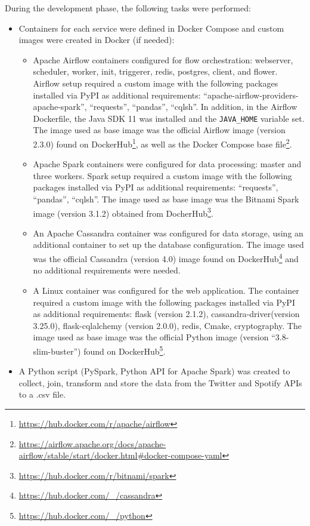 \nonzeroparskip During the development phase, the following tasks were performed:
\begin{itemize}
	\item Containers for each service were defined in Docker Compose and custom images were created in Docker (if needed):
	\begin{itemize}
		\item Apache Airflow containers configured for flow orchestration: webserver, scheduler, worker, init, triggerer, redis, postgres, client, and flower. Airflow setup required a custom image with the following packages installed via PyPI as additional requirements: ``apache-airflow-providers-apache-spark'', ``requests'', ``pandas'', ``cqlsh''. In addition, in the Airflow Dockerfile, the Java SDK 11 was installed and the \texttt{JAVA\_HOME} variable set. The image used as base image was the official Airflow image (version 2.3.0) found on DockerHub\footnote{\url{https://hub.docker.com/r/apache/airflow}}, as well as the Docker Compose base file\footnote{\url{https://airflow.apache.org/docs/apache-airflow/stable/start/docker.html\#docker-compose-yaml}}.
		\item Apache Spark containers were configured for data processing: master and three workers. Spark setup required a custom image with the following packages installed via PyPI as additional requirements: ``requests'', ``pandas'', ``cqlsh''. The image used as base image was the Bitnami Spark image (version 3.1.2) obtained from DocherHub\footnote{\url{https://hub.docker.com/r/bitnami/spark}}.
		\item An Apache Cassandra container was configured for data storage, using an additional container to set up the database configuration. The image used was the official Cassandra (version 4.0) image found on DockerHub\footnote{\url{https://hub.docker.com/_/cassandra}} and no additional requirements were needed.
		\item A Linux container was configured for the web application. The container required a custom image with the following packages installed via PyPI as additional requirements: flask (version 2.1.2), cassandra-driver(version 3.25.0), flask-cqlalchemy (version 2.0.0), redis, Cmake, cryptography. The image used as base image was the official Python image (version ``3.8-slim-buster'') found on DockerHub\footnote{\url{https://hub.docker.com/_/python}}.
	\end{itemize}
	\item A Python script (PySpark, Python API for Apache Spark) was created to collect, join, transform and store the data from the Twitter and Spotify APIs to a .csv file.

\end{itemize}
